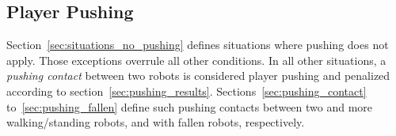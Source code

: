 \documentclass[12pt]{article}
\begin{document}
\newpage

\subsection{Player Pushing}
\label{sec:player_pushing}

Section~\ref{sec:situations_no_pushing} defines situations where pushing does not apply.
Those exceptions overrule all other conditions.
In all other situations, a \textit{pushing contact} between two robots is considered player pushing and penalized according to section~\ref{sec:pushing_results}.
Sections~\ref{sec:pushing_contact} to~\ref{sec:pushing_fallen} define such pushing contacts between two and more walking/standing robots, and with fallen robots, respectively.

%
%
%
\end{document}
